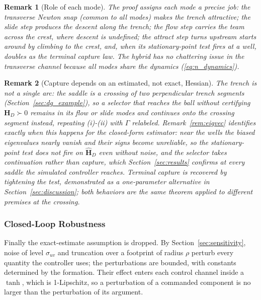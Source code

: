 \documentclass[lettersize,journal]{IEEEtran}
\newtheorem{remark}{Remark}
\begin{document}
\begin{remark}[Role of each mode]
The proof assigns each mode a precise job: the transverse Newton snap
(common to all modes) makes the trench attractive; the slide step produces the
descent along the trench; the flow step carries the team across the crest, where
descent is undefined; the attract step turns upstream starts around by climbing to
the crest, and, when its stationary-point test fires at a well, doubles as the
terminal capture law. The
hybrid has no chattering issue in the transverse channel because all
modes share the dynamics (\ref{eq:n_dynamics}).
\end{remark}

\begin{remark}[Capture depends on an estimated, not exact, Hessian]
\label{rem:capture_gap}
The trench is not a single arc: the saddle is a crossing of two
perpendicular trench segments (Section~\ref{sec:dg_example}), so a
selector that reaches the ball without certifying $\mathbf{H}_D \succ
0$ remains in its flow or slide modes and continues onto the crossing
segment instead, repeating (i)-(ii) with $\Gamma$ relabeled.
Remark~\ref{rem:eigvec} identifies exactly when this happens for the
closed-form estimator: near the wells the biased eigenvalues nearly
vanish and their signs become unreliable, so the stationary-point test
does not fire on $\hat{\mathbf{H}}_D$ even without noise, and the
selector takes continuation rather than capture, which
Section~\ref{sec:results} confirms at every saddle the simulated
controller reaches. Terminal capture is recovered by tightening the
test, demonstrated as a one-parameter alternative in
Section~\ref{sec:discussion}; both behaviors are the same theorem
applied to different premises at the crossing.
\end{remark}

\subsubsection{Closed-Loop Robustness}
\label{sec:stab_iss}

Finally the exact-estimate assumption is dropped. By
Section~\ref{sec:sensitivity}, noise of level $\sigma_{uv}$ and
truncation over a footprint of radius $\rho$ perturb every quantity the
controller uses; the perturbations are bounded, with constants
determined by the formation. Their effect enters each control channel
inside a $\tanh$, which is 1-Lipschitz, so a perturbation of a
commanded component is no larger than the perturbation of its argument.
\end{document}
